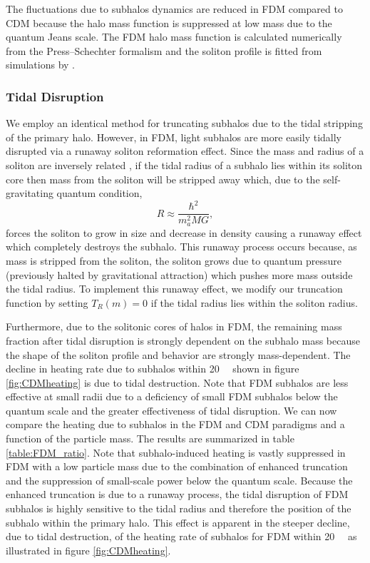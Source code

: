 \documentclass[usenatbib]{mnras}
\begin{document}
The fluctuations due to subhalos dynamics are reduced in FDM compared to CDM because the halo mass function is suppressed at low mass due to the quantum Jeans scale. The FDM halo mass function is calculated numerically from the Press--Schechter formalism \citep{substructure_FDM, marsh} and the soliton profile is fitted from simulations by \cite{schive_solitons}. 



\subsubsection{Tidal Disruption}

 
We employ an identical method for truncating subhalos due to the tidal stripping of the primary halo. However, in FDM, light subhalos are more easily tidally disrupted via a runaway soliton reformation effect. Since the mass and radius of a soliton are inversely related \citep{solitons}, if the tidal radius of a subhalo lies within its soliton core then mass from the soliton will be stripped away which, due to the self-gravitating quantum condition,
\begin{equation}
R \approx \frac{\hbar^2}{m_a^2 M G},
\end{equation} 
forces the soliton to grow in size and decrease in density causing a runaway effect which completely destroys the subhalo. This runaway process occurs because, as mass is stripped from the soliton, the soliton grows due to quantum pressure (previously halted by gravitational attraction) which pushes more mass outside the tidal radius. To implement this runaway effect, we modify our truncation function by setting $T_R(m) = 0$ if the tidal radius lies within the soliton radius. 

	Furthermore, due to the solitonic cores of halos in FDM, the remaining mass fraction after tidal disruption is strongly dependent on the subhalo mass because the shape of the soliton profile and behavior are strongly mass-dependent. The decline in heating rate due to subhalos within \SI{20}{\kilo\parsec} shown in figure \ref{fig:CDMheating} is due to tidal destruction. Note that FDM subhalos are less effective at small radii due to a deficiency of small FDM subhalos below the quantum scale and the greater effectiveness of tidal disruption. We can now compare the heating due to subhalos in the FDM and CDM paradigms and a function of the particle mass. The results are summarized in table \ref{table:FDM_ratio}. Note that subhalo-induced heating is vastly suppressed in FDM with a low particle mass due to the combination of enhanced truncation and the suppression of small-scale power below the quantum scale. Because the enhanced truncation is due to a runaway process, the tidal disruption of FDM subhalos is highly sensitive to the tidal radius and therefore the position of the subhalo within the primary halo.
This effect is apparent in the steeper decline,  due to tidal destruction, of the heating rate of subhalos for FDM within \SI{20}{\kilo\parsec} as illustrated in figure \ref{fig:CDMheating}.
 
\end{document}

